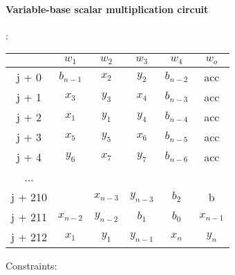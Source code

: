\paragraph{Variable-base scalar multiplication circuit}:
\begin{center}
\begin{tabular}{ c|c|c|c|c|c } 
  & $w_1$ & $w_2$ & $w_3$ & $w_4$ & $w_o$\\ 
 \hline
j + 0 & $b_{n - 1}$ & $x_2$ & $y_2$ & $b_{n - 2}$ & acc\\ 
j + 1 & $x_3$ & $ y_3$ & $x_4$ & $b_{n - 3}$ & acc\\ 
j + 2 & $x_1$ & $ y_1$ & $y_4$ & $b_{n - 4}$ & acc\\ 
j + 3 & $x_5$ & $y_5$ & $x_6$ & $b_{n - 5}$ & acc \\ 
j + 4 & $y_6$ & $ x_7$ & $y_7$ & $b_{n - 6}$ & acc\\
... & & & & &\\ 
j + 210 &  & $x_{n-3}$ & $y_{n-3}$ & $b_2$ & b\\ 
j + 211 & $x_{n-2}$ & $ y_{n-2}$ & $b_1$ & $b_0$ & $x_{n-1}$\\ 
j + 212 & $x_1$ & $ y_1$ & $y_{n-1}$ & $x_n$ & $y_n$ \\ 
\end{tabular}
\end{center}
 Constraints:
